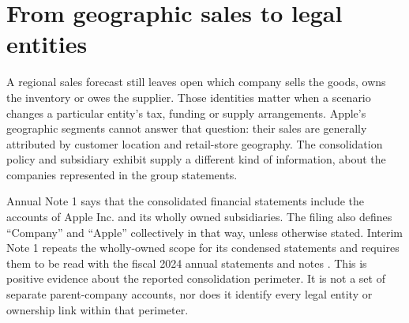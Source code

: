 \section{From geographic sales to legal entities}
\label{sec:apple-perimeter}

A regional sales forecast still leaves open which company sells the goods,
owns the inventory or owes the supplier. Those identities matter when a
scenario changes a particular entity's tax, funding or supply arrangements.
Apple's geographic segments cannot answer that question: their sales are
generally attributed by customer location and retail-store geography. The
consolidation policy and subsidiary exhibit supply a different kind of
information, about the companies represented in the group statements.

Annual Note 1 says that the consolidated financial statements include the
accounts of Apple Inc. and its wholly owned subsidiaries. The filing also
defines ``Company'' and ``Apple'' collectively in that way, unless otherwise
stated. Interim Note 1 repeats the wholly-owned scope for its condensed
statements and requires them to be read with the fiscal 2024 annual statements
and notes \citep[definition of Company and Note 1, printed pp.~1 and 34]{apple2024}
\citep[Note 1, printed p.~5]{apple2025q1}. This is positive evidence about the
reported consolidation perimeter. It is not a set of separate parent-company
accounts, nor does it identify every legal entity or ownership link within
that perimeter.

